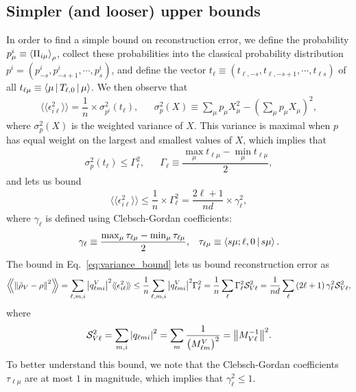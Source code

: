 \documentclass[notitlepage,twocolumn]{revtex4-2}
\newcommand{\f}[2]{\dfrac{#1}{#2}} %
\newcommand{\p}[1]{\left(#1\right)} %
\newcommand{\bk}{\Braket} %
\newcommand{\bbk}[1]{\langle\!\langle #1 \rangle\!\rangle}
\newcommand{\Bbk}[1]
{\left\langle\!\!\left\langle #1 \right\rangle\!\!\right\rangle}
\renewcommand{\S}{\mathcal{S}}
\newcommand{\1}{\mathds{1}}
\begin{document}
\subsection{Simpler (and looser) upper bounds}

In order to find a simple bound on reconstruction error, we define the probability $p^i_\mu\equiv\bk{\Pi_{i\mu}}_\rho$, collect these probabilities into the classical probability distribution $p^i = \p{p^i_{-s}, p^i_{-s+1}, \cdots, p^i_s}$, and define the vector $t_\ell \equiv \p{t_{\ell,-s},t_{\ell,-s+1},\cdots,t_{\ell s}}$ of all $t_{\ell\mu}\equiv\bk{\mu|T_{\ell,0}|\mu}$.
We then observe that
\begin{align}
  \bbk{\epsilon_{i\ell}^2} = \f1n \times \sigma_{p^i}^2\p{t_\ell},
  &&
  \sigma_p^2\p{X}
  \equiv \sum_\mu p_\mu X_\mu^2 - \p{\sum_\mu p_\mu X_\mu}^2,
\end{align}
where $\sigma_p^2\p{X}$ is the weighted variance of $X$.
This variance is maximal when $p$ has equal weight on the largest and smallest values of $X$, which implies that
\begin{align}
  \sigma_p^2\p{t_\ell} \le \Gamma_\ell^2,
  &&
  \Gamma_\ell \equiv \f{\max_\mu t_{\ell\mu} - \min_\mu t_{\ell\mu}}{2},
\end{align}
and lets us bound
\begin{align}
  \bbk{\epsilon_{i\ell}^2}
  \le \f1n \times \Gamma_\ell^2
  = \f{2\ell+1}{nd} \times \gamma_\ell^2,
  \label{eq:variance_bound}
\end{align}
where $\gamma_\ell$ is defined using Clebsch-Gordan coefficients:
\begin{align}
  \gamma_\ell \equiv \f{\max_\mu\tau_{\ell\mu} - \min_\mu\tau_{\ell\mu}}{2},
  &&
  \tau_{\ell\mu} \equiv \bk{s\mu;\ell,0|s\mu}.
\end{align}
The bound in Eq.~\eqref{eq:variance_bound} lets us bound reconstruction error as
\begin{align}
  \Bbk{\norm{\tilde\rho_V-\rho}^2}
  = \sum_{\ell,m,i} \abs{q^V_{\ell mi}}^2 \bbk{\epsilon_{i\ell}^2}
  \le \f1n \sum_{\ell,m,i} \abs{q^V_{\ell mi}}^2 \Gamma_\ell^2
  = \f1n \sum_\ell \Gamma_\ell^2 \S_{V\ell}^2
  = \f1{nd} \sum_\ell \p{2\ell+1} \gamma_\ell^2 \S_{V\ell}^2,
\end{align}
where
\begin{align}
  \S_{V\ell}^2 = \sum_{m,i} \abs{q_{\ell mi}}^2
  = \sum_m \f1{\p{M^V_{\ell m}}^2}
  = \norm{M_{V\ell}^{-1}}^2.
\end{align}
To better understand this bound, we note that the Clebsch-Gordan coefficients $\tau_{\ell\mu}$ are at most $1$ in magnitude, which implies that $\gamma_\ell^2\le 1$.
\end{document}
